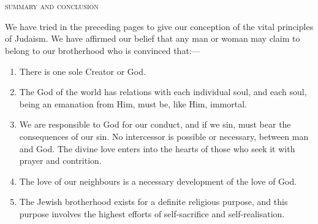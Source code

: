 \chapter{}

{
  \centering\larger
  \textsc{summary and conclusion}

}

\vspace*{2\baselineskip}

We have tried in the preceding pages to
give our conception of the vital principles
of Judaism. We have affirmed our belief
that any man or woman may claim to
belong to our brotherhood who is convinced
that:—

\begin{enumerate}
  \item There is one sole Creator or God.

  \item The God of the world has relations with
each individual soul, and each soul,
being an emanation from Him, must
be, like Him, immortal.

\item We are responsible to God for our
conduct, and if we sin, must bear the
consequences of our sin. No
intercessor is possible or necessary, between
man and God. The divine love
enters into the hearts of those who
seek it with prayer and contrition.

\item The love of our neighbours is a
necessary development of the love
of God.

\item The Jewish brotherhood exists for a
definite religious purpose, and this
purpose involves the highest efforts
of self-sacrifice and self-realisation.
\end{enumerate}

